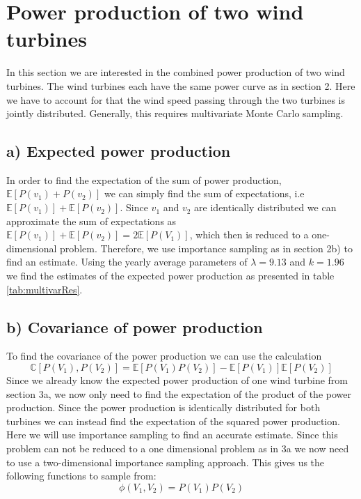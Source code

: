 \documentclass[a4paper]{article}
\begin{document}
\newpage
\section{Power production of two wind turbines}
\label{sec:twoTurbines}
In this section we are interested in the combined power production of two wind turbines. The wind turbines each have the same power curve as in section 2. Here we have to account for that the wind speed passing through the two turbines is jointly distributed. Generally, this requires multivariate Monte Carlo sampling.

\subsection*{a) Expected power production}
In order to find the expectation of the sum of power production, $\mathbb{E}[P(v_1) + P(v_2)]$ we can simply find the sum of expectations, i.e $\mathbb{E}[P(v_1)] + \mathbb{E}[P(v_2)]$. Since $v_1$ and $v_2$ are identically distributed we can approximate the sum of expectations as $\mathbb{E}[P(v_1)] + \mathbb{E}[P(v_2)] = 2\mathbb{E}[P(V_1)]$, which then is reduced to a one-dimensional problem. Therefore, we use importance sampling as in section 2b) to find an estimate. Using the yearly average parameters of $\lambda = 9.13$ and $k = 1.96$ we find the estimates of the expected power production as presented in table \ref{tab:multivarRes}.

\subsection*{b) Covariance of power production}
To find the covariance of the power production we can use the calculation
\begin{equation}
     \mathbb{C}[P(V_1), P(V_2)] = \mathbb{E}[P(V_1)P(V_2)] - \mathbb{E}[P(V_1)]\mathbb{E}[P(V_2)]
\end{equation}
Since we already know the expected power production of one wind turbine from section 3a, we now only need to find the expectation of the product of the power production. Since the power production is identically distributed for both turbines we can instead find the expectation of the squared power production. Here we will use importance sampling to find an accurate estimate. Since this problem can not be reduced to a one dimensional problem as in 3a we now need to use a two-dimensional importance sampling approach. This gives us the following functions to sample from:
\begin{equation}
    \phi(V_1, V_2) = P(V_1)P(V_2)
\end{equation}
\end{document}
